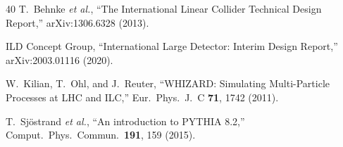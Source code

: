 \documentclass[prl,twocolumn,superscriptaddress,floatfix]{revtex4-2}
\begin{document}
\begin{thebibliography}{40}
  T.~Behnke \textit{et al.},
  ``The International Linear Collider Technical Design Report,''
  arXiv:1306.6328 (2013).

  ILD Concept Group,
  ``International Large Detector: Interim Design Report,''
  arXiv:2003.01116 (2020).

  W.~Kilian, T.~Ohl, and J.~Reuter,
  ``WHIZARD: Simulating Multi-Particle Processes at LHC and ILC,''
  Eur.\ Phys.\ J.\ C \textbf{71}, 1742 (2011).

  T.~Sj\"ostrand \textit{et al.},
  ``An introduction to PYTHIA 8.2,''
  Comput.\ Phys.\ Commun.\ \textbf{191}, 159 (2015).

\end{thebibliography}
\end{document}
